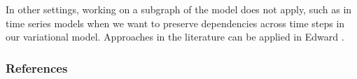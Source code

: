 In other settings, working on a subgraph of the model does not
apply, such as in time series models when we want to
preserve dependencies across time steps in our variational model.
Approaches in the literature can be applied in Edward
\citep{binder1997space,johnson2014stochastic,foti2014stochastic}.





\subsubsection{References}\label{references}
